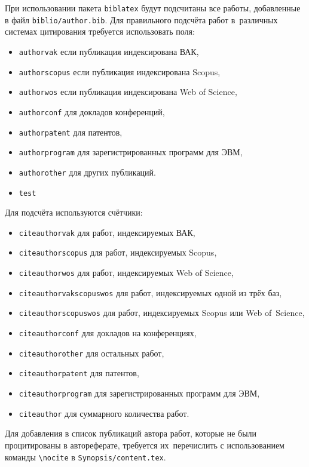 При использовании пакета \verb!biblatex! будут подсчитаны все работы, добавленные
в файл \verb!biblio/author.bib!. Для правильного подсчёта работ в~различных
системах цитирования требуется использовать поля:

\begin{itemize}
        \item \texttt{authorvak} если публикация индексирована ВАК,
        \item \texttt{authorscopus} если публикация индексирована Scopus,
        \item \texttt{authorwos} если публикация индексирована Web of Science,
        \item \texttt{authorconf} для докладов конференций,
        \item \texttt{authorpatent} для патентов,
        \item \texttt{authorprogram} для зарегистрированных программ для ЭВМ,
        \item \texttt{authorother} для других публикаций.
        \item \texttt{test}
\end{itemize}
Для подсчёта используются счётчики:
\begin{itemize}
        \item \texttt{citeauthorvak} для работ, индексируемых ВАК,
        \item \texttt{citeauthorscopus} для работ, индексируемых Scopus,
        \item \texttt{citeauthorwos} для работ, индексируемых Web of Science,
        \item \texttt{citeauthorvakscopuswos} для работ, индексируемых одной из трёх баз,
        \item \texttt{citeauthorscopuswos} для работ, индексируемых Scopus или Web of~Science,
        \item \texttt{citeauthorconf} для докладов на конференциях,
        \item \texttt{citeauthorother} для остальных работ,
        \item \texttt{citeauthorpatent} для патентов,
        \item \texttt{citeauthorprogram} для зарегистрированных программ для ЭВМ,
        \item \texttt{citeauthor} для суммарного количества работ.
\end{itemize}

Для добавления в список публикаций автора работ, которые не были процитированы в
автореферате, требуется их~перечислить с использованием команды \verb!\nocite! в
\verb!Synopsis/content.tex!.
